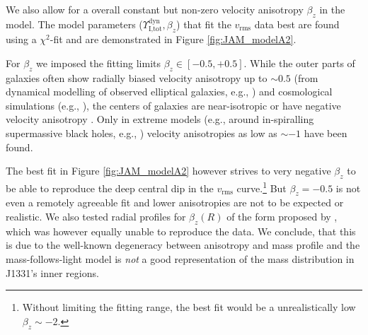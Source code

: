 \documentclass[useAMS,usenatbib]{mnras}
\begin{document}
We also allow for a overall constant but non-zero velocity anisotropy $\beta_z$ in the model. The model parameters ($\Upsilon_\text{I,tot}^\text{dyn},\beta_z$) that fit the $v_\text{rms}$ data best are found using a $\chi^2$-fit and are demonstrated in Figure \ref{fig:JAM_modelA2}. 

For $\beta_z$ we imposed the fitting limits $\beta_z \in [-0.5,+0.5]$. While the outer parts of galaxies often show radially biased velocity anisotropy up to $\sim 0.5$ (from dynamical modelling of observed elliptical galaxies, e.g., \citet{Kronawitter2000}) and cosmological simulations (e.g., \citealt{2004MNRAS.352..535D,2001ApJ...557..533F}), the centers of galaxies are near-isotropic or have negative velocity anisotropy \citep{2003ApJ...583...92G}. Only in extreme models (e.g., around in-spiralling supermassive black holes, e.g., \citealt{1997NewA....2..533Q}) velocity anisotropies as low as $\sim -1$ have been found.

The best fit in Figure \ref{fig:JAM_modelA2} however strives to very negative $\beta_z$ to be able to reproduce the deep central dip in the  $v_\text{rms}$ curve.\footnote{Without limiting the fitting range, the best fit would be a unrealistically low $\beta_z \sim -2$.} But $\beta_z = -0.5$ is not even a remotely agreeable fit and lower anisotropies are not to be expected or realistic. We also tested radial profiles for $\beta_z(R)$ of the form proposed by \citet{BaesVanHese}, which was however equally unable to reproduce the data. We conclude, that this is due to the well-known degeneracy between anisotropy and mass profile and the mass-follows-light model is \emph{not} a good representation of the mass distribution in J1331's inner regions.
\end{document}

